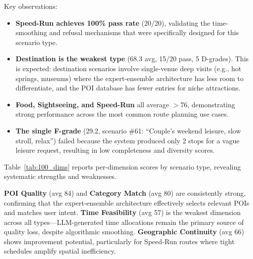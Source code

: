Key observations:
\begin{itemize}[leftmargin=*]
    \item \textbf{Speed-Run achieves 100\% pass rate} (20/20), validating the time-smoothing and refusal mechanisms that were specifically designed for this scenario type.
    \item \textbf{Destination is the weakest type} (68.3 avg, 15/20 pass, 5 D-grades). This is expected: destination scenarios involve single-venue deep visits (e.g., hot springs, museums) where the expert-ensemble architecture has less room to differentiate, and the POI database has fewer entries for niche attractions.
    \item \textbf{Food, Sightseeing, and Speed-Run} all average $>$76, demonstrating strong performance across the most common route planning use cases.
    \item \textbf{The single F-grade} (29.2, scenario \#61: ``Couple's weekend leisure, slow stroll, relax'') failed because the system produced only 2 stops for a vague leisure request, resulting in low completeness and diversity scores.
\end{itemize}

Table~\ref{tab:100_dims} reports per-dimension scores by scenario type, revealing systematic strengths and weaknesses.

\begin{table}[!t]
\centering
\caption{Per-dimension average scores by scenario type (0--100 scale).}
\label{tab:100_dims}
\end{table}

\textbf{POI Quality} (avg 84) and \textbf{Category Match} (avg 80) are consistently strong, confirming that the expert-ensemble architecture effectively selects relevant POIs and matches user intent. \textbf{Time Feasibility} (avg 57) is the weakest dimension across all types---LLM-generated time allocations remain the primary source of quality loss, despite algorithmic smoothing. \textbf{Geographic Continuity} (avg 66) shows improvement potential, particularly for Speed-Run routes where tight schedules amplify spatial inefficiency.

